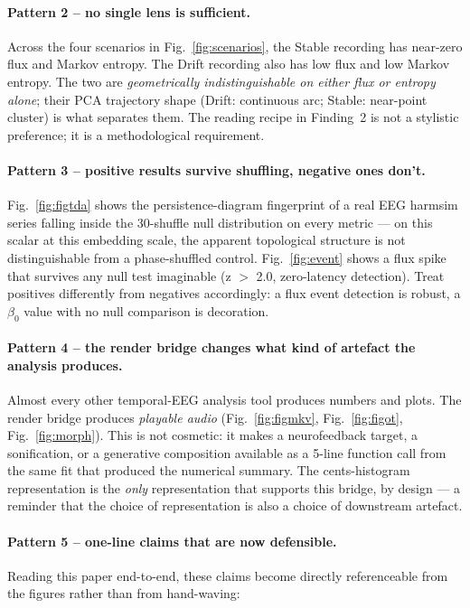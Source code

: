 \documentclass[11pt,a4paper]{article}
\begin{document}
\paragraph{Pattern 2 -- no single lens is sufficient.}
Across the four scenarios in Fig.~\ref{fig:scenarios}, the Stable
recording has near-zero flux and Markov entropy. The Drift recording
also has low flux and low Markov entropy. The two are
\emph{geometrically indistinguishable on either flux or entropy
alone}; their PCA trajectory shape (Drift: continuous arc; Stable:
near-point cluster) is what separates them. The reading recipe in
Finding~2 is not a stylistic preference; it is a methodological
requirement.

\paragraph{Pattern 3 -- positive results survive shuffling, negative
ones don't.}  Fig.~\ref{fig:figtda} shows the persistence-diagram
fingerprint of a real EEG harmsim series falling inside the
30-shuffle null distribution on every metric --- on this scalar at
this embedding scale, the apparent topological structure is not
distinguishable from a phase-shuffled control. Fig.~\ref{fig:event}
shows a flux spike that survives any null test imaginable
(z $>$ 2.0, zero-latency detection). Treat positives differently from
negatives accordingly: a flux event detection is robust, a $\beta_0$
value with no null comparison is decoration.

\paragraph{Pattern 4 -- the render bridge changes what kind of
artefact the analysis produces.}  Almost every other temporal-EEG
analysis tool produces numbers and plots. The render bridge produces
\emph{playable audio} (Fig.~\ref{fig:figmkv}, Fig.~\ref{fig:figot},
Fig.~\ref{fig:morph}). This is not cosmetic: it makes a
neurofeedback target, a sonification, or a generative composition
available as a 5-line function call from the same fit that produced
the numerical summary. The cents-histogram representation is the
\emph{only} representation that supports this bridge, by design --- a
reminder that the choice of representation is also a choice of
downstream artefact.

\paragraph{Pattern 5 -- one-line claims that are now defensible.}
Reading this paper end-to-end, these claims become directly
referenceable from the figures rather than from hand-waving:
\end{document}
